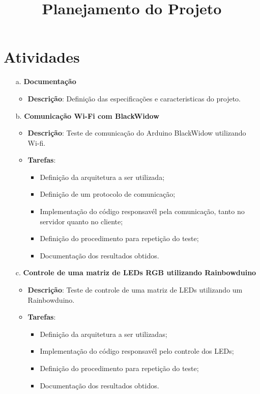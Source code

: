 \documentclass[a4paper,10pt]{article}
\title{Planejamento do Projeto}
\author{}
\date{}
\begin{document}
\maketitle

\section{Atividades}

\begin{enumerate}
    \item[a.] {\bf Documentação}
	\begin{itemize}
	    \item {\bf Descrição}: Definição das especificações e caracteristicas do projeto.
	\end{itemize}

    \item[b.] {\bf Comunicação Wi-Fi com BlackWidow}
	\begin{itemize}
	    \item {\bf Descrição}: Teste de comunicação do Arduino BlackWidow utilizando Wi-fi.
	    \item {\bf Tarefas}:
		\begin{itemize}
			\item Definição da arquitetura a ser utilizada;
			\item Definição de um protocolo de comunicação;
			\item Implementação do código responsavél pela comunicação, tanto no servidor quanto no cliente;
			\item Definição do procedimento para repetição do teste;
			\item Documentação dos resultados obtidos.
		\end{itemize}
	\end{itemize}

    \item[c.] {\bf Controle de uma matriz de LEDs RGB utilizando Rainbowduino}
	\begin{itemize}
	    \item {\bf Descrição}: Teste de controle de uma matriz de LEDs utilizando um Rainbowduino.
	    \item {\bf Tarefas}:
		\begin{itemize}
		    \item Definição da arquitetura a ser utilizadas;
		    \item Implementação do código responsavél pelo controle dos LEDs;
		    \item Definição do procedimento para repetição do teste;
		    \item Documentação dos resultados obtidos.
		\end{itemize}
	\end{itemize}


\end{enumerate}
\end{document}
